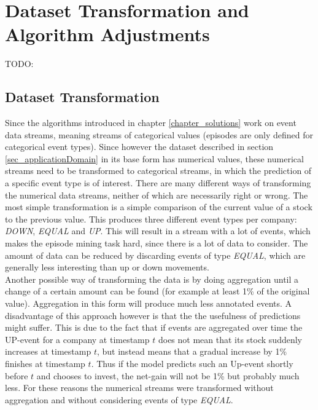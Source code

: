 \section{Dataset Transformation and Algorithm Adjustments}
\label{sec_transformation}

TODO: 


\subsection{Dataset Transformation}

Since the algorithms introduced in chapter \ref{chapter_solutions} work on event data streams, meaning streams of categorical values (episodes are only defined for categorical event types). Since however the dataset described in section \ref{sec_applicationDomain} in its base form has numerical values, these numerical streams need to be transformed to categorical streams, in which the prediction of a specific event type is of interest. There are many different ways of transforming the numerical data streams, neither of which are necessarily right or wrong. The most simple transformation is a simple comparison of the current value of a stock to the previous value. This produces three different event types per company: \textit{DOWN}, \textit{EQUAL} and \textit{UP}. This will result in a stream with a lot of events, which makes the episode mining task hard, since there is a lot of data to consider. The amount of data can be reduced by discarding events of type \textit{EQUAL}, which are generally less interesting than up or down movements. \\
Another possible way of transforming the data is by doing aggregation until a change of a certain amount can be found (for example at least 1\% of the original value). Aggregation in this form will produce much less annotated events. A disadvantage of this approach however is that the the usefulness of predictions might suffer. This is due to the fact that if events are aggregated over time the UP-event for a company at timestamp $t$ does not mean that its stock suddenly increases at timestamp $t$, but instead means that a gradual increase by 1\% finishes at timestamp $t$. Thus if the model predicts such an Up-event shortly before $t$ and chooses to invest, the net-gain will not be 1\% but probably much less. For these reasons the numerical streams were transformed without aggregation and without considering events of type \textit{EQUAL}.

